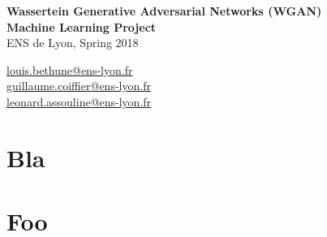 \documentclass[a4paper]{report}
\begin{document}
\begin{titlepage}
\begin{center}
 {\Huge\bfseries Wassertein Generative Adversarial Networks (WGAN)\\}
 \vspace{2cm}
 {\Large \bfseries Machine Learning Project \\}
 \vspace{2cm}
 {\large ENS de Lyon, Spring 2018 \\}
 \vspace{2cm}

{\Large {} \color{black}
	\href{mailto:louis.bethune@ens-lyon.fr}{louis.bethune@ens-lyon.fr}\\
    \vspace{0.2cm}
	\href{mailto:guillaume.coiffier@ens-lyon.fr}{guillaume.coiffier@ens-lyon.fr}\\
	\vspace{0.2cm}
	\href{mailto:leonard.assouline@ens-lyon.fr}{leonard.assouline@ens-lyon.fr}\\
}

\vspace{2cm}

\vfill
\end{center}
\end{titlepage}

\setcounter{tocdepth}{1}
\tableofcontents

\chapter{Bla}

\lipsum

\chapter{Foo}

\lipsum


\nocite{*}


\end{document}
